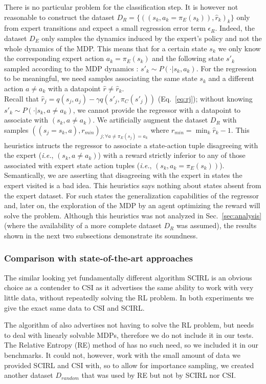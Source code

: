 \documentclass{llncs}
\begin{document}
There is no particular problem for the classification step. It is however not reasonable to construct the dataset $D_R = \{((s_k,a_k=\pi_E(s_k)),\hat r_k)_k\}$ only from expert transitions and expect a small regression error term $\epsilon_R$. Indeed, the dataset $D_E$ only samples the dynamics induced by the expert's policy and not the whole dynamics of the MDP. 
This means that for a certain state $s_k$ we only know the corresponding expert action $a_k=\pi_E(s_k)$ and the following state $s'_k$ sampled according to the MDP dynamics : $s'_k \sim P(\cdot|s_k,a_k)$. For the regression to be meaningful, we need samples associating the same state $s_k$ and a different action $a\neq a_k$ with a datapoint $\hat r \neq \hat r_k$.\\
Recall that $\hat r_j = q(s_j,a_j) - \gamma q(s'_j,\pi_C(s'_j))$ (Eq.~\eqref{eq:rj}); without knowing $s'_k \sim P(\cdot|s_k,a\neq a_k)$, we cannot provide the regressor with a datapoint to associate with $(s_k,a\neq a_k)$.
We artificially augment the dataset $D_R$ with samples $((s_j=s_k,a),r_{min})_{j;\forall a\neq \pi_E(s_j) = a_k}$ where
$  r_{min} = \min_k\hat r_k - 1$.
This heuristics intructs the regressor to associate a state-action tuple disagreeing with the expert ({\it i.e.}, $(s_k,a\neq a_k)$) with a reward strictly inferior to any of those associated with expert state action tuples ({\it i.e.}, $(s_k,a_k=\pi_E(s_k))$). Semantically, we are asserting that disagreeing with the expert in states the expert visited is a bad idea. This heuristics says nothing about states absent from the expert dataset. For such states the generalization capabilities of the regressor and, later on, the exploration of the MDP by an agent optimizing the reward will solve the problem.
Although this heuristics was not analyzed in Sec.~\ref{sec:analysis} (where the availability of a more complete dataset $D_R$ was assumed), the results shown in the next two subsections demonstrate its soundness.
\subsubsection{Comparison with state-of-the-art approaches}
The similar looking yet fundamentally different algorithm SCIRL \cite{klein2012scirl} is an obvious choice as a contender to CSI as it advertises the same ability to work with very little data, without repeatedly solving the RL problem. In both experiments we give the exact same data to CSI and SCIRL.

The algorithm of \cite{dvijotham2010inverse} also advertises not having to solve the RL problem, but needs to deal with linearly solvable MDPs, therefore we do not include it in our tests. The Relative Entropy (RE) method of \cite{boularias2011relative} has no such need, so we included it in our benchmarks. It could not, however, work with the small amount of data we provided SCIRL and CSI with, so to allow for importance sampling, we created another dataset $D_{random}$ that was used by RE but not by SCIRL nor CSI.
\end{document}
